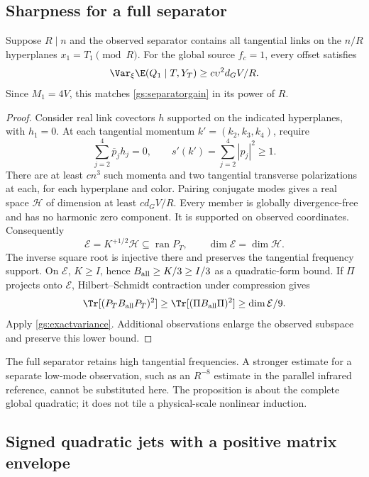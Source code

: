 \subsection{Sharpness for a full separator}

\begin{proposition}
\label{gs:sharpness}
Suppose \(R\mid n\) and the observed separator contains all tangential links
on the \(n/R\) hyperplanes \(x_1=T_1\pmod R\). For the global source
\(f_c=1\), every offset satisfies
\begin{equation}
 \Var_\xi\E(Q_1\mid T,Y_T)
 \ge c\upsilon^2d_G V/R.
 \label{gs:sharp}
\end{equation}
Since \(M_1=4V\), this matches \eqref{gs:separatorgain} in its power of \(R\).
\end{proposition}
\begin{proof}
Consider real link covectors \(h\) supported on the indicated hyperplanes,
with \(h_1=0\). At each tangential momentum \(k'=(k_2,k_3,k_4)\), require
\[
 \sum_{j=2}^4\overline p_jh_j=0,
 \qquad s'(k')=\sum_{j=2}^4|p_j|^2\ge1.
\]
There are at least \(cn^3\) such momenta and two tangential transverse
polarizations at each, for each hyperplane and color. Pairing conjugate modes
gives a real space \(\mathcal H\) of dimension at least \(cd_GV/R\).
Every member is globally divergence-free and has no harmonic zero component.
It is supported on observed coordinates. Consequently
\[
 \mathcal E=K^{+1/2}\mathcal H\subseteq\operatorname{ran}P_T,
 \qquad \dim\mathcal E=\dim\mathcal H.
\]
The inverse square root is injective there and preserves the tangential
frequency support. On \(\mathcal E\), \(K\ge I\), hence
\(B_{\rm all}\ge K/3\ge I/3\) as a quadratic-form bound. If \(\Pi\) projects
onto \(\mathcal E\), Hilbert--Schmidt contraction under compression gives
\[
 \Tr[(P_TB_{\rm all}P_T)^2]
 \ge\Tr[(\Pi B_{\rm all}\Pi)^2]\ge\dim\mathcal E/9.
\]
Apply \eqref{gs:exactvariance}. Additional observations enlarge the observed
subspace and preserve this lower bound.
\end{proof}

The full separator retains high tangential frequencies. A stronger estimate
for a separate low-mode observation, such as an \(R^{-8}\) estimate in the
parallel infrared reference, cannot be substituted here. The proposition is
about the complete global quadratic; it does not tile a physical-scale
nonlinear induction.

\subsection{Signed quadratic jets with a positive matrix envelope}

